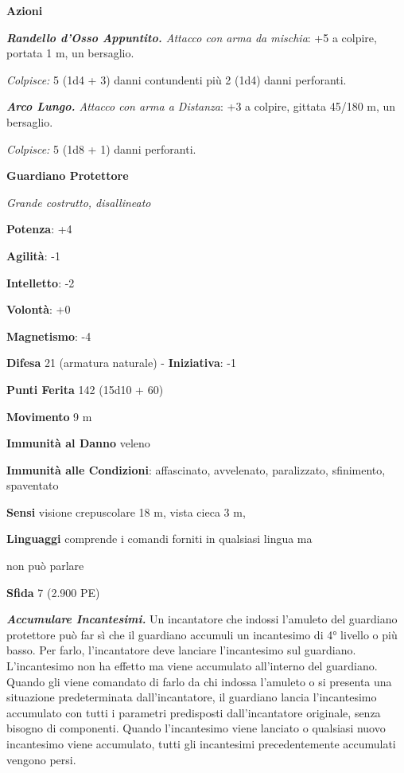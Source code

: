 \begin{multicols}{2}
\smallskip\textbf{Azioni}

\emph{\textbf{Randello d'Osso Appuntito.} Attacco con arma da mischia}:
+5 a colpire, portata 1 m, un bersaglio.

\emph{Colpisce:} 5 (1d4 + 3) danni contundenti più 2 (1d4) danni
perforanti.

\emph{\textbf{Arco Lungo.} Attacco con arma a Distanza}: +3 a colpire,
gittata 45/180 m, un bersaglio.

\emph{Colpisce:} 5 (1d8 + 1) danni perforanti.

\textbf{Guardiano Protettore}

\emph{Grande costrutto, disallineato}

\textbf{Potenza}: +4

\textbf{Agilità}: -1

\textbf{Intelletto}: -2

\textbf{Volontà}: +0

\textbf{Magnetismo}: -4

\textbf{Difesa} 21 (armatura naturale) - \textbf{Iniziativa}: -1

\textbf{Punti Ferita} 142 (15d10 + 60)

\textbf{Movimento} 9 m

\textbf{Immunità al Danno} veleno

\textbf{Immunità alle Condizioni}: affascinato, avvelenato, paralizzato,
sfinimento, spaventato

\textbf{Sensi} visione crepuscolare 18 m, vista cieca 3 m, 

\textbf{Linguaggi} comprende i comandi forniti in qualsiasi lingua ma

non può parlare

\textbf{Sfida} 7 (2.900 PE)\smallskip

\emph{\textbf{Accumulare Incantesimi.}} Un incantatore che indossi
l'amuleto del guardiano protettore può far sì che il guardiano accumuli
un incantesimo di 4° livello o più basso. Per farlo, l'incantatore deve
lanciare l'incantesimo sul guardiano. L'incantesimo non ha effetto ma
viene accumulato all'interno del guardiano. Quando gli viene comandato
di farlo da chi indossa l'amuleto o si presenta una situazione
predeterminata dall'incantatore, il guardiano lancia l'incantesimo
accumulato con tutti i parametri predisposti dall'incantatore originale,
senza bisogno di componenti. Quando l'incantesimo viene lanciato o
qualsiasi nuovo incantesimo viene accumulato, tutti gli incantesimi
precedentemente accumulati vengono persi.


\end{multicols}
